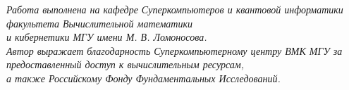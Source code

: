 \thispagestyle{empty}

\begin{vplace}[0.5]
	\begin{center}
		\textit{
			Работа выполнена на кафедре Суперкомпьютеров и квантовой информа­тики факультета Вычислительной математики\\и кибернетики МГУ имени М. В. Ломоносова.
			\\[72pt]
			Автор выражает благодарность Суперкомпьютерному центру ВМК МГУ за предоставленный доступ к вычислительным ресурсам,\\а также Российскому Фонду Фундаментальных Исследований.
		}
	\end{center}
\end{vplace}
